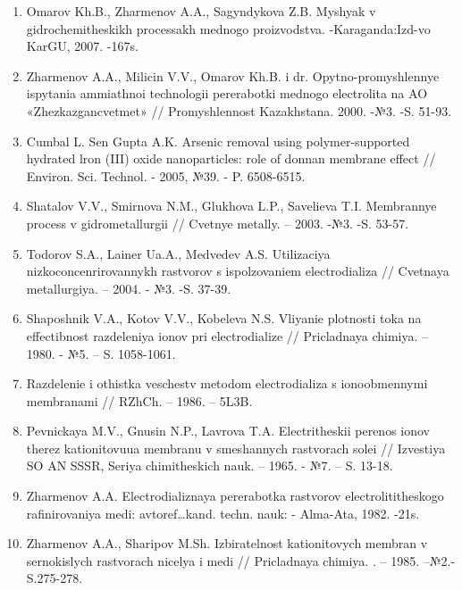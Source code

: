 \begin{enumerate}
\item
Omarov Kh.B., Zharmenov A.A., Sagyndykova Z.B. Myshyak v
gidrochemitheskikh processakh mednogo proizvodstva. -Karaganda:Izd-vo
KarGU, 2007. -167s.

\item
Zharmenov A.A., Milicin V.V., Omarov Kh.B. i dr. Opytno-promyshlennye
ispytania ammiathnoi technologii pererabotki mednogo electrolita na AO
«Zhezkazgancvetmet» // Promyshlennost Kazakhstana. 2000. -№3. -S. 51-93.

\item
Cumbal L. Sen Gupta A.K. Arsenic removal using polymer-supported
hydrated lron (III) oxide nanoparticles: role of donnan membrane effect
// Environ. Sci. Technol. - 2005, №39. - P. 6508-6515.

\item
Shatalov V.V., Smirnova N.M., Glukhova L.P., Savelieva T.I.
Membrannye process v gidrometallurgii // Cvetnye metally. -- 2003. -№3.
-S. 53-57.

\item
Todorov S.A., Lainer Ua.A., Medvedev A.S. Utilizaciya
nizkoconcenrirovannykh rastvorov s ispolzovaniem electrodializa //
Cvetnaya metallurgiya. -- 2004. - №3. -S. 37-39.

\item
Shaposhnik V.A., Kotov V.V., Kobeleva N.S. Vliyanie plotnosti toka na
effectibnost razdeleniya ionov pri electrodialize // Pricladnaya
chimiya. -- 1980. - №5. -- S. 1058-1061.

\item
Razdelenie i othistka veschestv metodom electrodializa s
ionoobmennymi membranami // RZhCh. -- 1986. -- 5L3B.

\item
Pevnickaya M.V., Gnusin N.P., Lavrova T.A. Electritheskii perenos
ionov therez kationitovuua membranu v smeshannych rastvorach solei //
Izvestiya SO AN SSSR, Seriya chimitheskich nauk. -- 1965. - №7. -- S.
13-18.

\item
Zharmenov A.A. Electrodializnaya pererabotka rastvorov
electrolititheskogo rafinirovaniya medi: avtoref\ldots kand. techn.
nauk: - Alma-Ata, 1982. -21s.

\item
Zharmenov A.A., Sharipov M.Sh. Izbiratelnost kationitovych membran v
sernokislych rastvorach nicelya i medi // Pricladnaya chimiya. . --
1985. --№2.-S.275-278.


\end{enumerate}
